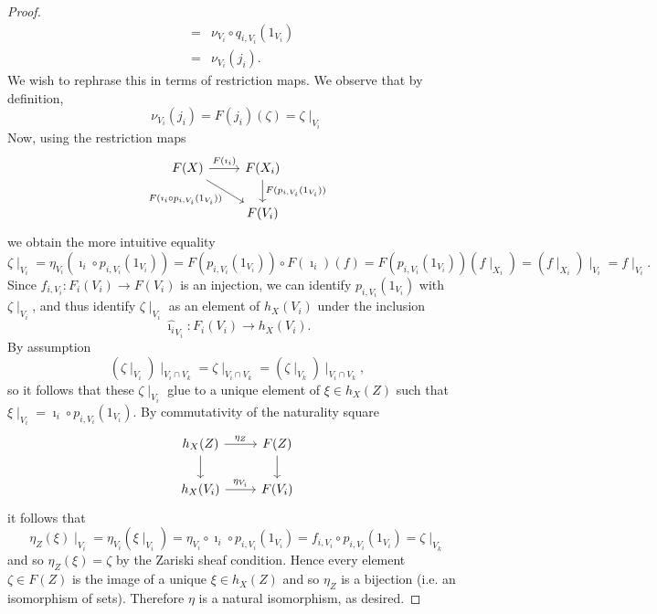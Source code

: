 \documentclass[10pt]{amsart}
\begin{document}
\begin{thm}
\begin{proof}
\begin{eqnarray*}
      &=& \nu_{V_i} \circ q_{i,V_i}(1_{V_i})\\
      &=& \nu_{V_i}(j_i).
    \end{eqnarray*}
    We wish to rephrase this in terms of restriction maps.
    We observe that by definition,
    $$\nu_{V_i}(j_i) = F(j_i)(\zeta) = \zeta\mid_{V_i}$$
    Now, using the restriction maps
    $$\begin{tikzcd}
      F(X) \arrow{r}{F(\imath_i)} \arrow[swap]{rd}{F(\imath_i \circ p_{i,V_i}(1_{V_i}))} & F(X_i)\arrow{d}{F(p_{i,V_i}(1_{V_i}))}\\
      & F(V_i)
    \end{tikzcd}$$
    we obtain the more intuitive equality
    $$\zeta\mid_{V_i} = \eta_{V_i}\left(\imath_i \circ p_{i,V_i}(1_{V_i})\right) = F(p_{i,V_i}(1_{V_i})) \circ F(\imath_i)(f) = F(p_{i,V_i}(1_{V_i}))(f\mid_{X_i}) = \left(f\mid_{X_i}\right)\mid_{V_i} = f\mid_{V_i}.$$
    Since $f_{i,V_i} : F_i(V_i) \rightarrow F(V_i)$ is an injection, we can identify $p_{i,V_i}(1_{V_i})$ with $\zeta\mid_{V_i}$, and thus identify $\zeta\mid_{V_i}$ as an element of $h_X(V_i)$ under the inclusion
    $$\hat{\imath_i}_{V_i} \colon F_i(V_i) \rightarrow h_X(V_i).$$
    By assumption
    $$(\zeta\mid_{V_i})\mid_{V_i \cap V_k} = \zeta\mid_{V_i \cap V_k} = (\zeta\mid_{V_k})\mid_{V_i \cap V_k},$$
    so it follows that these $\zeta\mid_{V_i}$ glue to a unique element of $\xi \in h_X(Z)$ such that $\xi\mid_{V_i} = \imath_i \circ p_{i,V_i}(1_{V_i})$.
    By commutativity of the naturality square
    $$\begin{tikzcd}
      h_X(Z) \arrow{r}{\eta_Z}\arrow{d} & F(Z)\arrow{d}\\
      h_X(V_i) \arrow{r}{\eta_{V_i}} & F(V_i)
    \end{tikzcd}$$
    it follows that
    $$\eta_Z(\xi)\mid_{V_i} = \eta_{V_i}(\xi\mid_{V_i}) = \eta_{V_i} \circ \imath_i \circ p_{i,V_i}(1_{V_i}) = f_{i,V_i} \circ p_{i,V_i}(1_{V_i}) = \zeta\mid_{V_k}$$
    and so $\eta_Z(\xi) = \zeta$ by the Zariski sheaf condition.
    Hence every element $\zeta \in F(Z)$ is the image of a unique $\xi \in h_X(Z)$ and so $\eta_Z$ is a bijection (i.e. an isomorphism of sets).
    Therefore $\eta$ is a natural isomorphism, as desired.

  \end{proof}
\end{thm}
\end{document}
